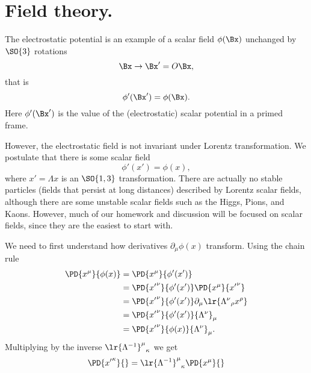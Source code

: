%
%
\section{Field theory.}

The electrostatic potential is an example of a scalar field \( \phi(\Bx) \) unchanged by \(\SO{3}\) rotations
\begin{equation}\label{eqn:qftLecture3:240}
\Bx \rightarrow \Bx' = O \Bx,
\end{equation}
that is
\begin{equation}\label{eqn:qftLecture3:260}
\phi'(\Bx') = \phi(\Bx).
\end{equation}
Here \( \phi'(\Bx') \) is the value of the (electrostatic) scalar potential in a primed frame.

However, the electrostatic field is not invariant under Lorentz transformation.
We postulate that there is some scalar field
\begin{equation}\label{eqn:qftLecture3:280}
\phi'(x') = \phi(x),
\end{equation}
where \( x' = \Lambda x \) is an \(\SO{1,3}\) transformation.
There are actually no stable particles (fields that persist at long distances) described by Lorentz scalar fields, although there are some unstable scalar fields such as the
Higgs, Pions, and Kaons.
However,
much of our homework and discussion will be focused on scalar fields, since
they are the
easiest to start with.

We need to first understand how derivatives \( \partial_\mu \phi(x) \) transform.  Using the chain rule
\begin{equation}\label{eqn:qftLecture3:300}
\begin{aligned}
\PD{x^\mu}{\phi(x)}
&=
\PD{x^\mu}{\phi'(x')} \\
&=
\PD{{x'}^\nu}{\phi'(x')}
\PD{{x}^\mu}{{x'}^\nu} \\
&=
\PD{{x'}^\nu}{\phi'(x')}
\partial_\mu \lr{
{\Lambda^\nu}_\rho x^\rho
} \\
&=
\PD{{x'}^\nu}{\phi'(x')}
{\Lambda^\nu}_\mu \\
&=
\PD{{x'}^\nu}{\phi(x)}
{\Lambda^\nu}_\mu.
\end{aligned}
\end{equation}
Multiplying by the inverse \( {\lr{\Lambda^{-1}}^\mu}_\kappa \) we get
\begin{equation}\label{eqn:qftLecture3:320}
\PD{{x'}^\kappa}{}
=
{\lr{\Lambda^{-1}}^\mu}_\kappa \PD{x^\mu}{}
\end{equation}

